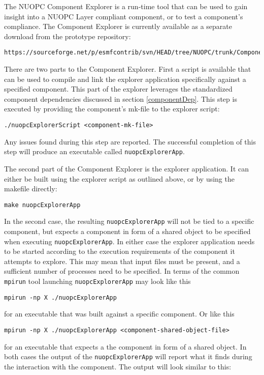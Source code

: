 %

\label{Explorer}

The NUOPC Component Explorer is a run-time tool that can be used to gain insight into a NUOPC Layer compliant component, or to test a component's compliance. The Component Explorer is currently available as a separate download from the prototype repository:

\begin{verbatim}
https://sourceforge.net/p/esmfcontrib/svn/HEAD/tree/NUOPC/trunk/ComponentExplorer/
\end{verbatim}

There are two parts to the Component Explorer. First a script is available that can be used to compile and link the explorer application specifically against a specified component. This part of the explorer leverages the standardized component dependencies discussed in section \ref{componentDep}. This step is executed by providing the component's mk-file to the explorer script:

\begin{verbatim}
./nuopcExplorerScript <component-mk-file>
\end{verbatim}

Any issues found during this step are reported. The successful completion of this step will produce an executable called {\tt nuopcExplorerApp}.

The second part of the Component Explorer is the explorer application. It can either be built using the explorer script as outlined above, or by using the makefile directly:

\begin{verbatim}
make nuopcExplorerApp
\end{verbatim}

In the second case, the resulting {\tt nuopcExplorerApp} will not be tied to a specific component, but expects a component in form of a shared object to be specified when executing {\tt nuopcExplorerApp}. In either case the explorer application needs to be started according to the execution requirements of the component it attempts to explore. This may mean that input files must be present, and a sufficient number of processes need to be specified. In terms of the common {\tt mpirun} tool launching {\tt nuopcExplorerApp} may look like this
\begin{verbatim}
mpirun -np X ./nuopcExplorerApp
\end{verbatim}
for an executable that was built against a specific component. Or like this
\begin{verbatim}
mpirun -np X ./nuopcExplorerApp <component-shared-object-file>
\end{verbatim}
for an executable that expects a the component in form of a shared object. In both cases the output of the {\tt nuopcExplorerApp} will report what it finds during the interaction with the component. The output will look similar to this:

